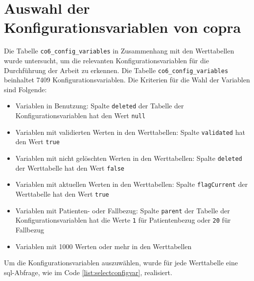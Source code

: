 \section{Auswahl der Konfigurationsvariablen von \acs{copra}} \label{sec:configvarcopra}

Die Tabelle \texttt{co6\_config\_variables} in Zusammenhang mit den Werttabellen wurde untersucht, um die relevanten Konfigurationsvariablen für die Durchführung der Arbeit zu erkennen. Die Tabelle \texttt{co6\_config\_variables} beinhaltet 7409 Konfigurationsvariablen.
Die Kriterien für die Wahl der Variablen sind Folgende:

\begin{itemize}
	\item Variablen in Benutzung: Spalte \texttt{deleted} der Tabelle der Konfigurationsvariablen hat den Wert \texttt{null}
	\item Variablen mit validierten Werten in den Werttabellen: Spalte \texttt{validated} hat den Wert \texttt{true}
	\item Variablen mit nicht gelöschten Werten in den Werttabellen: Spalte \texttt{deleted} der Werttabelle hat den Wert \texttt{false}
	\item Variablen mit aktuellen Werten in den Werttabellen: Spalte \texttt{flagCurrent} der Werttabelle hat den Wert \texttt{true}
	\item Variablen mit Patienten- oder Fallbezug: Spalte \texttt{parent} der Tabelle der Konfigurationsvariablen hat die Werte \texttt{1} für Patientenbezug oder \texttt{20} für Fallbezug
	\item Variablen mit 1000 Werten oder mehr in den Werttabellen
\end{itemize}

Um die Konfigurationsvariablen auszuwählen, wurde für jede Werttabelle eine \ac{sql}-Abfrage, wie im Code \ref{list:selectconfigvar}, realisiert.

